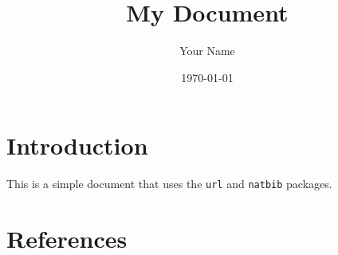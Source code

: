 \documentclass{article}
\begin{document}
\title{My Document}
\author{Your Name}
\date{\today}

\maketitle

\section{Introduction}

This is a simple document that uses the \texttt{url} and \texttt{natbib} packages.

\section{References}



\end{document}
